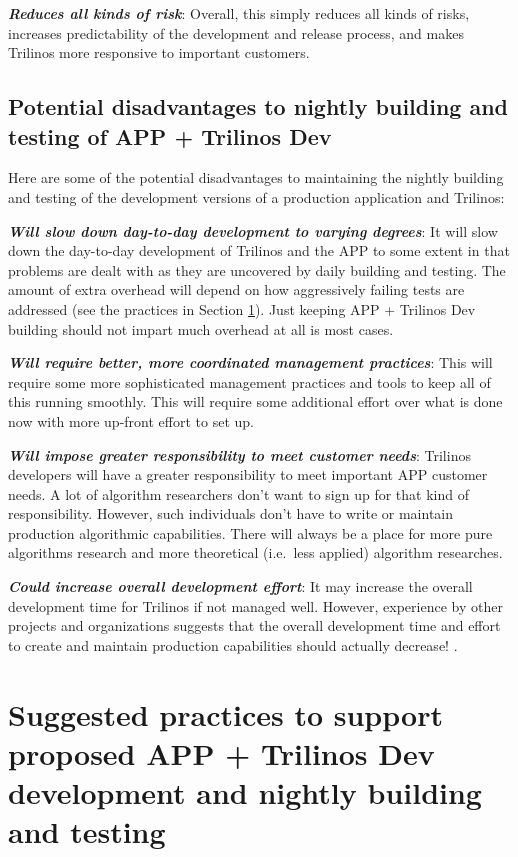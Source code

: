\documentclass[pdf,ps2pdf,11pt]{SANDreport}
\begin{document}
{}\textit{\textbf{Reduces all kinds of risk}}: Overall, this simply reduces all
kinds of risks, increases predictability of the development and release
process, and makes Trilinos more responsive to important customers.


%
{}\subsection{Potential disadvantages to nightly building and testing of APP +
Trilinos Dev}
%

Here are some of the potential disadvantages to maintaining the nightly
building and testing of the development versions of a production application
and Trilinos:

{}\textit{\textbf{Will slow down day-to-day development to varying degrees}}:
It will slow down the day-to-day development of Trilinos and the APP to some
extent in that problems are dealt with as they are uncovered by daily building
and testing.  The amount of extra overhead will depend on how aggressively
failing tests are addressed (see the practices in Section
{}\ref{sec:suggested-practices}).  Just keeping APP + Trilinos Dev building
should not impart much overhead at all is most cases.

{}\textit{\textbf{Will require better, more coordinated management practices}}:
This will require some more sophisticated management practices and tools to
keep all of this running smoothly.  This will require some additional effort
over what is done now with more up-front effort to set up.

{}\textit{\textbf{Will impose greater responsibility to meet customer needs}}:
Trilinos developers will have a greater responsibility to meet important APP
customer needs.  A lot of algorithm researchers don't want to sign up for that
kind of responsibility.  However, such individuals don't have to write or
maintain production algorithmic capabilities.  There will always be a place
for more pure algorithms research and more theoretical (i.e.\ less applied)
algorithm researches.

{}\textit{\textbf{Could increase overall development effort}}: It may increase the
overall development time for Trilinos if not managed well.  However,
experience by other projects and organizations suggests that the overall
development time and effort to create and maintain production capabilities
should actually decrease! {}\cite{book:code-complete-2}.


%
{}\section{Suggested practices to support proposed APP + Trilinos Dev
development and nightly building and testing}
\label{sec:suggested-practices}
%
\end{document}
